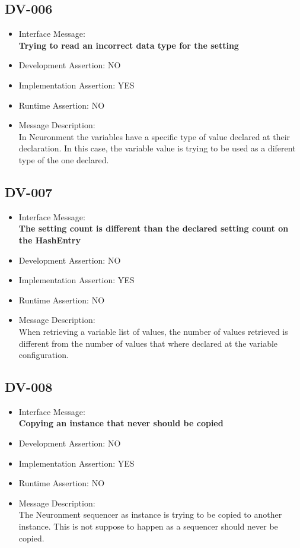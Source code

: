 \subsection{DV-006}
\begin{itemize}
  \item Interface Message:\\[1em]
    \textbf{Trying to read an incorrect data type for the setting}
  \item Development Assertion: NO
  \item Implementation Assertion: YES
  \item Runtime Assertion: NO
  \item Message Description:\\[1em]
    In Neuronment the variables have a specific type of value declared at their declaration. In this case, the variable value is trying to be used as a diferent type of the one declared.
\end{itemize}

\subsection{DV-007}
\begin{itemize}
  \item Interface Message:\\[1em]
    \textbf{The setting count is different than the declared setting count on the HashEntry}
  \item Development Assertion: NO
  \item Implementation Assertion: YES
  \item Runtime Assertion: NO
  \item Message Description:\\[1em]
    When retrieving a variable list of values, the number of values retrieved is different from the number of values that where declared at the variable configuration.
\end{itemize}

\subsection{DV-008}
\begin{itemize}
  \item Interface Message:\\[1em]
    \textbf{Copying an instance that never should be copied}
  \item Development Assertion: NO
  \item Implementation Assertion: YES
  \item Runtime Assertion: NO
  \item Message Description:\\[1em]
    The Neuronment sequencer as instance is trying to be copied to another instance. This is not suppose to happen as a sequencer should never be copied.
\end{itemize}

